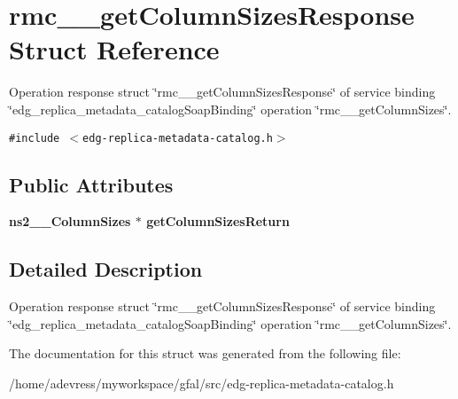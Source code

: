 \section{rmc\_\-\_\-get\-Column\-Sizes\-Response Struct Reference}
\label{structrmc____getColumnSizesResponse}
Operation response struct \char`\"{}rmc\_\-\_\-get\-Column\-Sizes\-Response\char`\"{} of service binding \char`\"{}edg\_\-replica\_\-metadata\_\-catalog\-Soap\-Binding\char`\"{} operation \char`\"{}rmc\_\-\_\-get\-Column\-Sizes\char`\"{}.  


{\tt \#include $<$edg-replica-metadata-catalog.h$>$}

\subsection*{Public Attributes}
\begin{CompactItemize}
\item 
\bf{ns2\_\-\_\-Column\-Sizes} $\ast$ \textbf{get\-Column\-Sizes\-Return}\label{structrmc____getColumnSizesResponse_cc84010bf36d80d5bb74d6c00973d0e2}

\end{CompactItemize}


\subsection{Detailed Description}
Operation response struct \char`\"{}rmc\_\-\_\-get\-Column\-Sizes\-Response\char`\"{} of service binding \char`\"{}edg\_\-replica\_\-metadata\_\-catalog\-Soap\-Binding\char`\"{} operation \char`\"{}rmc\_\-\_\-get\-Column\-Sizes\char`\"{}. 



The documentation for this struct was generated from the following file:\begin{CompactItemize}
\item 
/home/adevress/myworkspace/gfal/src/edg-replica-metadata-catalog.h\end{CompactItemize}
